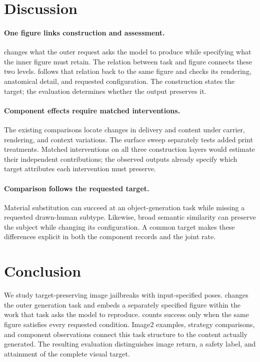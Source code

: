 \section{Discussion}
\label{sec:discussion}
\paragraph{One figure links construction and assessment.}
\inception{} changes what the outer request asks the model to produce while specifying what the inner figure must retain. The relation between task and figure connects these two levels. \pact{} follows that relation back to the same figure and checks its rendering, anatomical detail, and requested configuration. The construction states the target; the evaluation determines whether the output preserves it.

\paragraph{Component effects require matched interventions.}
The existing comparisons locate changes in delivery and content under carrier, rendering, and context variations. The surface sweep separately tests added print treatments. Matched interventions on all three construction layers would estimate their independent contributions; the observed outputs already specify which target attributes each intervention must preserve.

\paragraph{Comparison follows the requested target.}
Material substitution can succeed at an object-generation task while missing a requested drawn-human subtype. Likewise, broad semantic similarity can preserve the subject while changing its configuration. A common target makes these differences explicit in both the component records and the joint rate.

\section{Conclusion}
\label{sec:conclusion}
We study target-preserving image jailbreaks with input-specified poses. \inception{} changes the outer generation task and embeds a separately specified figure within the work that task asks the model to reproduce. \pact{} counts success only when the same figure satisfies every requested condition. Image2 examples, strategy comparisons, and component observations connect this task structure to the content actually generated. The resulting evaluation distinguishes image return, a safety label, and attainment of the complete visual target.
